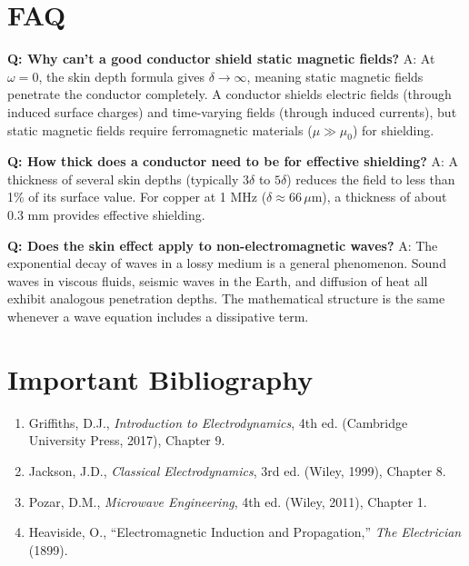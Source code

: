 \section*{FAQ}

\textbf{Q: Why can't a good conductor shield static magnetic fields?}
A: At $\omega = 0$, the skin depth formula gives $\delta \to \infty$, meaning static magnetic fields penetrate the conductor completely. A conductor shields electric fields (through induced surface charges) and time-varying fields (through induced currents), but static magnetic fields require ferromagnetic materials ($\mu \gg \mu_0$) for shielding.

\textbf{Q: How thick does a conductor need to be for effective shielding?}
A: A thickness of several skin depths (typically $3\delta$ to $5\delta$) reduces the field to less than 1\% of its surface value. For copper at 1 MHz ($\delta \approx 66\,\mu$m), a thickness of about 0.3 mm provides effective shielding.

\textbf{Q: Does the skin effect apply to non-electromagnetic waves?}
A: The exponential decay of waves in a lossy medium is a general phenomenon. Sound waves in viscous fluids, seismic waves in the Earth, and diffusion of heat all exhibit analogous penetration depths. The mathematical structure is the same whenever a wave equation includes a dissipative term.
\section*{Important Bibliography}

\begin{enumerate}
\item Griffiths, D.J., \textit{Introduction to Electrodynamics}, 4th ed. (Cambridge University Press, 2017), Chapter 9.
\item Jackson, J.D., \textit{Classical Electrodynamics}, 3rd ed. (Wiley, 1999), Chapter 8.
\item Pozar, D.M., \textit{Microwave Engineering}, 4th ed. (Wiley, 2011), Chapter 1.
\item Heaviside, O., ``Electromagnetic Induction and Propagation,'' \textit{The Electrician} (1899).
\end{enumerate}


